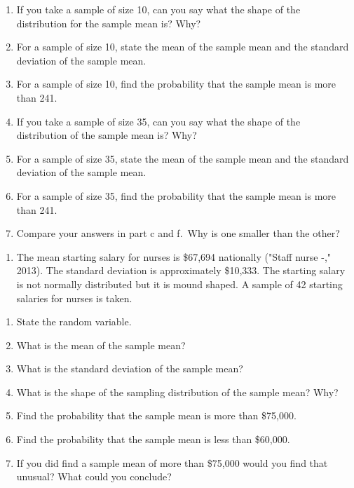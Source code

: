 \documentclass[
]{book}
\providecommand{\tightlist}{%
  \setlength{\itemsep}{0pt}\setlength{\parskip}{0pt}}
\begin{document}
\begin{enumerate}
\def\labelenumi{\alph{enumi}.}
\tightlist
\item
  If you take a sample of size 10, can you say what the shape of the distribution for the sample mean is? Why?
\item
  For a sample of size 10, state the mean of the sample mean and the standard deviation of the sample mean.
\item
  For a sample of size 10, find the probability that the sample mean is more than 241.
\item
  If you take a sample of size 35, can you say what the shape of the distribution of the sample mean is? Why?
\item
  For a sample of size 35, state the mean of the sample mean and the standard deviation of the sample mean.
\item
  For a sample of size 35, find the probability that the sample mean is more than 241.
\item
  Compare your answers in part c and f.~Why is one smaller than the other?
\end{enumerate}

\begin{enumerate}
\def\labelenumi{\arabic{enumi}.}
\setcounter{enumi}{2}
\tightlist
\item
  The mean starting salary for nurses is \$67,694 nationally ("Staff nurse -," 2013). The standard deviation is approximately \$10,333. The starting salary is not normally distributed but it is mound shaped. A sample of 42 starting salaries for nurses is taken.
\end{enumerate}

\begin{enumerate}
\def\labelenumi{\alph{enumi}.}
\tightlist
\item
  State the random variable.
\item
  What is the mean of the sample mean?
\item
  What is the standard deviation of the sample mean?
\item
  What is the shape of the sampling distribution of the sample mean? Why?
\item
  Find the probability that the sample mean is more than \$75,000.
\item
  Find the probability that the sample mean is less than \$60,000.
\item
  If you did find a sample mean of more than \$75,000 would you find that unusual? What could you conclude?
\end{enumerate}
\end{document}
